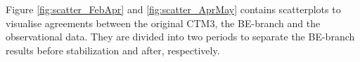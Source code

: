 %


\medskip 

Figure \ref{fig:scatter_FebApr} and \ref{fig:scatter_AprMay} contains scatterplots to visualise agreements between the original CTM3, the BE-branch and the observational data. They are divided into two periods to separate the BE-branch results before stabilization and after, respectively. 
















